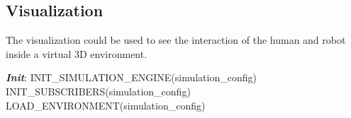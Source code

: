 \subsection{Visualization} The visualization could be used to see the interaction of the human and robot inside a virtual 3D environment.
\begin{algorithm}
 \textbf{\emph{Init}}:\;
 \quad INIT\_SIMULATION\_ENGINE(simulation\_config) \;
 \quad INIT\_SUBSCRIBERS(simulation\_config) \;
 \quad LOAD\_ENVIRONMENT(simulation\_config) \; 
\end{algorithm}


